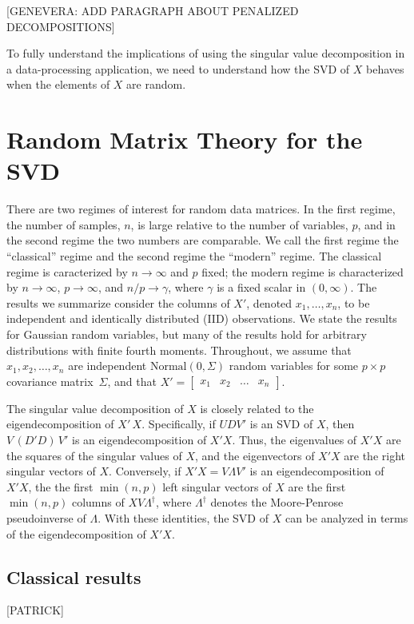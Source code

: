 \documentclass{eoeauth}
\newcommand{\Normal}{\mathrm{Normal }}
\begin{document}
[GENEVERA: ADD PARAGRAPH ABOUT PENALIZED DECOMPOSITIONS]

To fully understand the implications of using the singular value
decomposition in a data-processing application, we need to understand
how the SVD of $X$ behaves when the elements of $X$ are random.


\section{Random Matrix Theory for the SVD}

There are two regimes of interest for random data matrices.  In the
first regime, the number of samples, $n$, is large relative to the number of
variables, $p$, and in the second regime the two numbers are comparable.
We call the first regime the ``classical'' regime and the second
regime the ``modern'' regime.  The classical regime is caracterized by
$n \to \infty$ and $p$ fixed; the modern regime is characterized by $n
\to \infty$, $p \to \infty$, and $n/p \to \gamma$, where $\gamma$ is a
fixed scalar in $(0,\infty)$.  The results we summarize consider the
columns of $X'$, denoted $x_1, \dotsc, x_n$, to be independent and
identically distributed (IID) observations.  We state the results for
Gaussian random variables, but many of the results hold for
arbitrary distributions with finite fourth moments.  Throughout, we
assume that $x_1, x_2, \dotsc, x_n$ are independent $\Normal(0, \Sigma)$ random
variables for some $p \times p$ covariance matrix~$\Sigma$, and that
\(
  X' =
  \begin{bmatrix}
    x_1 & x_2 & \dots & x_n
  \end{bmatrix}.
\)

The singular value decomposition of $X$ is closely related to the
eigendecomposition of $X' \, X$.  Specifically, if $U D V'$ is an SVD
of $X$, then $V \, (D' D) \, V'$ is an eigendecomposition of $X' X$.
Thus, the eigenvalues of $X' X$ are the squares of the singular values
of $X$, and the eigenvectors of $X' X$ are the right singular vectors
of $X$.  Conversely, if $X' X = V \Lambda V'$ is an eigendecomposition of
$X' X$, the the first $\min(n,p)$ left singular vectors of $X$ are the
first $\min(n,p)$ columns of $X V \Lambda^\dagger$, where
$\Lambda^\dagger$ denotes the Moore-Penrose pseudoinverse of $\Lambda$.
With these identities, the SVD of $X$ can be analyzed in terms of the
eigendecomposition of $X' X$.


\subsection{Classical results}
[PATRICK]
\end{document}
